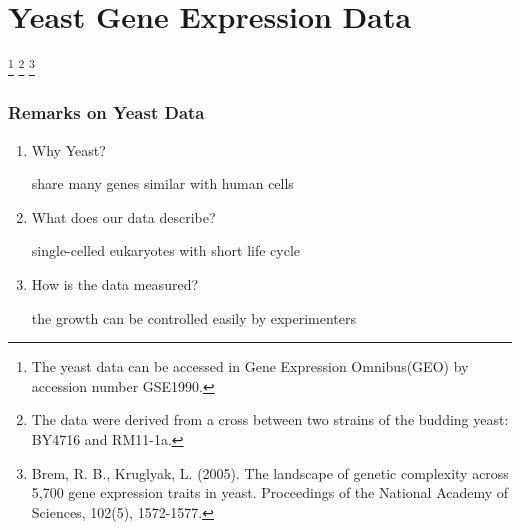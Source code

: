 \section{Yeast Gene Expression Data}
\begin{frame}
    \sectionpage 
    \footnote[1]{The yeast data can be accessed in Gene Expression Omnibus(GEO) by accession number GSE1990.}
    \footnote[2]{The data were derived from a cross between two strains of the budding yeast: BY4716 and RM11-1a.}
    \footnote[3]{Brem, R. B., Kruglyak, L. (2005). The landscape of genetic complexity across 5,700 gene expression traits in yeast. Proceedings of the National Academy of Sciences, 102(5), 1572-1577.}
\end{frame}

\begin{frame}\frametitle{Remarks on Yeast Data}
    \begin{enumerate}
        \item Why Yeast?
        
        share many genes similar with human cells
        
        \item What does our data describe?
        
        single-celled eukaryotes with short life cycle
        
        \item How is the data measured? 
        
        the growth can be controlled easily by experimenters
    \end{enumerate}
\end{frame}

